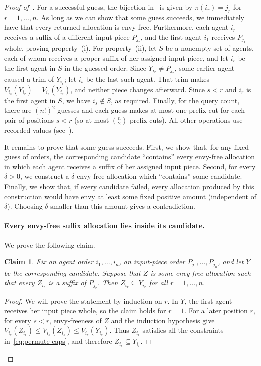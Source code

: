 \documentclass[11pt]{article}
\theoremstyle{plain}
\newtheorem{claim}[claim]{Claim}
\theoremstyle{definition}
\theoremstyle{plain}
\begin{document}
\begin{proof}[Proof of~]
For a successful guess, the bijection in~ is given by $\pi(i_r)=j_r$ for $r=1,\dots,n$. As long as we can show that some guess succeeds, we immediately have that every returned allocation is envy-free. Furthermore, each agent $i_r$ receives a suffix of a different input piece $P_{j_r}$, and the first agent $i_1$ receives $P_{j_1}$ whole, proving property~(i). For property~(ii), let $S$ be a nonempty set of agents, each of whom receives a proper suffix of her assigned input piece, and let $i_r$ be the first agent in $S$ in the guessed order. Since $Y_{i_r}\ne P_{j_r}$, some earlier agent caused a trim of $Y_{i_r}$; let $i_s$ be the last such agent. That trim makes $V_{i_s}(Y_{i_r})=V_{i_s}(Y_{i_s})$, and neither piece changes afterward. Since $s<r$ and $i_r$ is the first agent in $S$, we have $i_s\notin S$, as required.
Finally, for the query count, there are $(n!)^2$ guesses and each guess makes at most one prefix cut for each pair of positions $s<r$ (so at most $\binom n2$ prefix cuts). All other operations use recorded values (see~). 

It remains to prove that some guess succeeds. First, we show that, for any fixed guess of orders, the corresponding candidate ``contains'' every envy-free allocation in which each agent receives a suffix of her assigned input piece. Second, for every $\delta>0$, we construct a $\delta$-envy-free allocation which ``contains'' some candidate. Finally, we show that, if every candidate failed, every allocation produced by this construction would have envy at least some fixed positive amount (independent of $\delta$). Choosing $\delta$ smaller than this amount gives a contradiction.

\paragraph{Every envy-free suffix allocation lies inside its candidate.}
We prove the following claim.
\begin{claim}\label{claim:containment}
Fix an agent order $i_1,\dots,i_n$, an input-piece order $P_{j_1},\dots,P_{j_n}$, and let $Y$ be the corresponding candidate. Suppose that $Z$ is some envy-free allocation such that every $Z_{i_r}$ is a suffix of $P_{j_r}$. Then $Z_{i_r}\subseteq Y_{i_r}$ for all $r = 1, \dots, n$.
\end{claim}

\begin{proof}
We will prove the statement by induction on $r$. In $Y$, the first agent receives her input piece whole, so the claim holds for $r=1$. For a later position $r$, for every $s<r$, envy-freeness of $Z$ and the induction hypothesis give $V_{i_s}(Z_{i_r}) \le V_{i_s}(Z_{i_s}) \le V_{i_s}(Y_{i_s})$. Thus $Z_{i_r}$ satisfies all the constraints in~\eqref{eq:permute-caps}, and therefore $Z_{i_r}\subseteq Y_{i_r}$.
\end{proof}


\end{proof}
\end{document}
